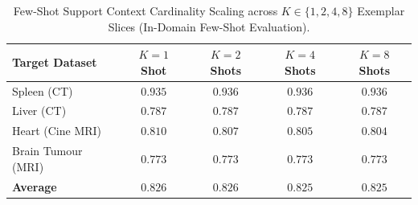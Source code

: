 \begin{table}[t]
\centering
\caption{Few-Shot Support Context Cardinality Scaling across $K \in \{1, 2, 4, 8\}$ Exemplar Slices (In-Domain Few-Shot Evaluation).}
\label{tab:shot_ablation}
\begin{tabular}{l|c|c|c|c}
\hline
\textbf{Target Dataset} & \textbf{$K=1$ Shot} & \textbf{$K=2$ Shots} & \textbf{$K=4$ Shots} & \textbf{$K=8$ Shots} \\
\hline
Spleen (CT)        & $0.935$ & $0.936$ & $0.936$ & $0.936$ \\
Liver (CT)         & $0.787$ & $0.787$ & $0.787$ & $0.787$ \\
Heart (Cine MRI)   & $0.810$ & $0.807$ & $0.805$ & $0.804$ \\
Brain Tumour (MRI) & $0.773$ & $0.773$ & $0.773$ & $0.773$ \\
\hline
\textbf{Average}   & $\mathbf{0.826}$ & $\mathbf{0.826}$ & $\mathbf{0.825}$ & $\mathbf{0.825}$ \\
\hline
\end{tabular}
\end{table}

